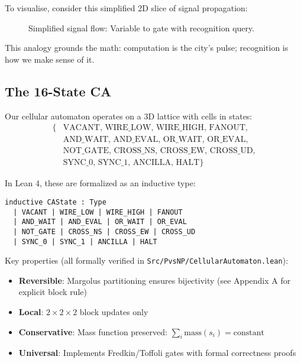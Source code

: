 \documentclass[11pt]{article}
\theoremstyle{plain}
\theoremstyle{definition}
\theoremstyle{remark}
\begin{document}
To visualise, consider this simplified 2D slice of signal propagation:
\begin{figure}[h]
\centering
{}
\caption{Simplified signal flow: Variable to gate with recognition query.}
\label{fig:ca-analogy}
\end{figure}

This analogy grounds the math: computation is the city's pulse; recognition is how we make sense of it.

\subsection{The 16-State CA}

Our cellular automaton operates on a 3D lattice with cells in states:
\begin{align}
\{&\text{VACANT, WIRE\_LOW, WIRE\_HIGH, FANOUT,}\\
&\text{AND\_WAIT, AND\_EVAL, OR\_WAIT, OR\_EVAL,}\\
&\text{NOT\_GATE, CROSS\_NS, CROSS\_EW, CROSS\_UD,}\\
&\text{SYNC\_0, SYNC\_1, ANCILLA, HALT}\}
\end{align}

In Lean 4, these are formalized as an inductive type:

\begin{verbatim}
inductive CAState : Type
  | VACANT | WIRE_LOW | WIRE_HIGH | FANOUT
  | AND_WAIT | AND_EVAL | OR_WAIT | OR_EVAL  
  | NOT_GATE | CROSS_NS | CROSS_EW | CROSS_UD
  | SYNC_0 | SYNC_1 | ANCILLA | HALT
\end{verbatim}

Key properties (all formally verified in \texttt{Src/PvsNP/CellularAutomaton.lean}):
\begin{itemize}
\item \textbf{Reversible}: Margolus partitioning ensures bijectivity (see Appendix A for explicit block rule)
\item \textbf{Local}: $2 \times 2 \times 2$ block updates only
\item \textbf{Conservative}: Mass function preserved: $\sum_{i} \text{mass}(s_i) = \text{constant}$
\item \textbf{Universal}: Implements Fredkin/Toffoli gates with formal correctness proofs
\end{itemize}
\end{document}
